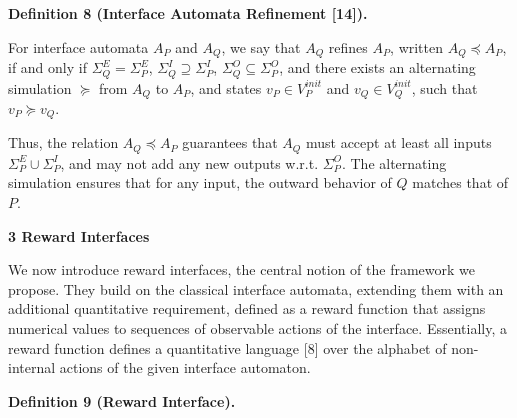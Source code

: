  
 
\par\medskip\noindent\textbf{Definition 8 (Interface Automata Refinement [14]).}\par
 
 
For interface automata $A_{P}$ and $A_{Q}$, we say that $A_{Q}$ refines $A_{P}$, written $A_{Q}\preceq A_{P}$, if and only if $\Sigma_{Q}^{E}=\Sigma_{P}^{E}$, $\Sigma_{Q}^{I}\supseteq\Sigma_{P}^{I}$, $\Sigma_{Q}^{O}\subseteq\Sigma_{P}^{O}$, and there exists an alternating simulation $\succeq$ from $A_{Q}$ to $A_{P}$, and states $v_{P}\in V_{P}^{init}$ and $v_{Q}\in V_{Q}^{init}$, such that $v_{P}\succeq v_{Q}$.\par
 
 
 
 
Thus, the relation $A_{Q}\preceq A_{P}$ guarantees that $A_{Q}$ must accept at least all inputs $\Sigma_{P}^{E}\cup\Sigma_{P}^{I}$, and may not add any new outputs w.r.t. $\Sigma_{P}^{O}$. The alternating simulation ensures that for any input, the outward behavior of $Q$ matches that of $P$.\par
 
  
 


 
\par\medskip\noindent\textbf{3 Reward Interfaces}\par
 
 
We now introduce reward interfaces, the central notion of the framework we propose. They build on the classical interface automata, extending them with an additional quantitative requirement, defined as a reward function that assigns numerical values to sequences of observable actions of the interface. Essentially, a reward function defines a quantitative language [8] over the alphabet of non-internal actions of the given interface automaton.\par
 
 
 
\par\medskip\noindent\textbf{Definition 9 (Reward Interface).}\par
 
